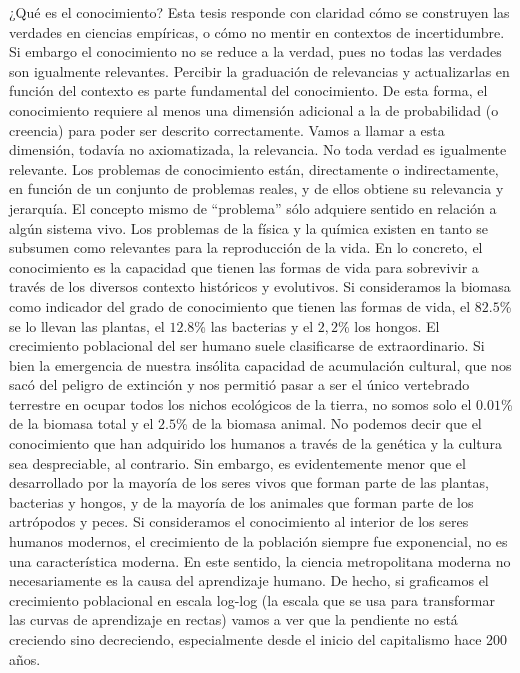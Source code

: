 \documentclass[a4paper,11pt]{book}
\theoremstyle{definition}
\begin{document}
¿Qué es el conocimiento?
%
Esta tesis responde con claridad cómo se construyen las verdades en  ciencias empíricas, o cómo no mentir en contextos de incertidumbre.
%
Si embargo el conocimiento no se reduce a la verdad, pues no todas las verdades son igualmente relevantes.
%
Percibir la graduación de relevancias y actualizarlas en función del contexto es parte fundamental del conocimiento.
%
De esta forma, el conocimiento requiere al menos una dimensión adicional a la de probabilidad (o creencia) para poder ser descrito correctamente.
%
Vamos a llamar a esta dimensión, todavía no axiomatizada, la relevancia.
%
No toda verdad es igualmente relevante.
%
Los problemas de conocimiento están, directamente o indirectamente, en función de un conjunto de problemas reales, y de ellos obtiene su relevancia y jerarquía.
%
El concepto mismo de ``problema'' sólo adquiere sentido en relación a algún sistema vivo.
%
Los problemas de la física y la química existen en tanto se subsumen como relevantes para la reproducción de la vida.
%
En lo concreto, el conocimiento es la capacidad que tienen las formas de vida para sobrevivir a través de los diversos contexto históricos y evolutivos.
%
Si consideramos la biomasa como indicador del grado de conocimiento que tienen las formas de vida, el $82.5$\% se lo llevan las plantas, el $12.8$\% las bacterias y el $2,2$\% los hongos.
%
El crecimiento poblacional del ser humano suele clasificarse de extraordinario.
%
Si bien la emergencia de nuestra insólita capacidad de acumulación cultural, que nos sacó del peligro de extinción y nos permitió pasar a ser el único vertebrado terrestre en ocupar todos los nichos ecológicos de la tierra, no somos solo el $0.01$\% de la biomasa total y el $2.5$\% de la biomasa animal.
%
No podemos decir que el conocimiento que han adquirido los humanos a través de la genética y la cultura sea despreciable, al contrario.
%
Sin embargo, es evidentemente menor que el desarrollado por la mayoría de los seres vivos que forman parte de las plantas, bacterias y hongos, y de la mayoría de los animales que forman parte de los artrópodos y peces.
%
Si consideramos el conocimiento al interior de los seres humanos modernos, el crecimiento de la población siempre fue exponencial, no es una característica moderna.
%
En este sentido, la ciencia metropolitana moderna no necesariamente es la causa del aprendizaje humano.
%
De hecho, si graficamos el crecimiento poblacional en escala log-log (la escala que se usa para transformar las curvas de aprendizaje en rectas) vamos a ver que la pendiente no está creciendo sino decreciendo, especialmente desde el inicio del capitalismo hace 200 años.
\end{document}
